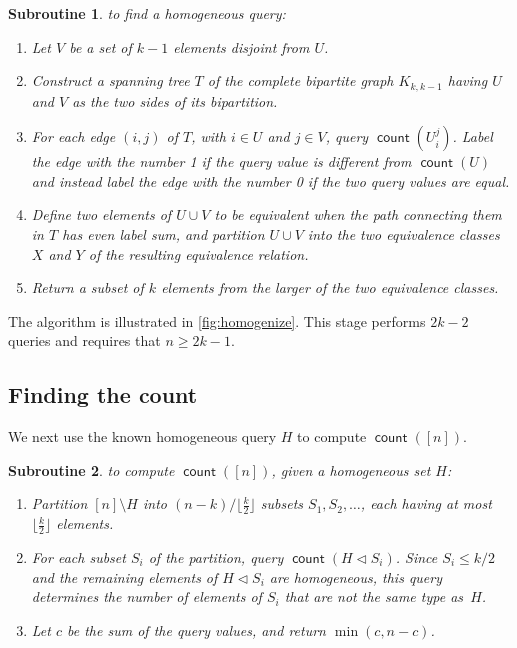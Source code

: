 \documentclass[11pt]{llncs}
\newcommand{\qcount}{\operatorname{\mathsf{count}}}
\newcommand{\inject}{\triangleleft}
\newtheorem{subroutine}{Subroutine}
\begin{document}
\begin{subroutine} to find a homogeneous query:
\label{sbr:homogeneous}
\begin{enumerate}
\item Let $V$ be a set of $k-1$ elements disjoint from $U$.
\item Construct a spanning tree $T$ of the complete bipartite graph $K_{k,k-1}$ having $U$ and $V$ as the two sides of its bipartition.
\item For each edge $(i,j)$ of $T$, with $i\in U$ and $j\in V$, query $\qcount(U_i^j)$. Label the edge with the number 1 if the query value is different from $\qcount(U)$ and instead label the edge with the number 0 if the two query values are equal.
\item Define two elements of $U\cup V$ to be equivalent when the path connecting them in $T$ has even label sum, and partition $U\cup V$ into the two equivalence classes $X$ and $Y$ of the resulting equivalence relation.
\item Return a subset of $k$ elements from the larger of the two equivalence classes.\end{enumerate}
\end{subroutine}

The algorithm is illustrated in \autoref{fig:homogenize}.
This stage performs $2k-2$ queries and requires that $n\ge 2k-1$.

\subsection{Finding the count}

We next use the known homogeneous query $H$ to compute $\qcount([n])$.

\begin{subroutine} to compute $\qcount([n])$, given a homogeneous set $H$:
\begin{enumerate}
\item Partition $[n]\setminus H$ into $(n-k)/\lfloor \tfrac{k}{2}\rfloor$ subsets $S_1,S_2,\dots$, each having at most $\lfloor \tfrac{k}{2}\rfloor$ elements.
\item For each subset $S_i$ of the partition, query $\qcount(H\inject S_i)$. Since $S_i\le k/2$ and the remaining elements of $H\inject S_i$ are homogeneous, this query determines the number of elements of $S_i$ that are not the same type as~$H$.
\item Let $c$ be the sum of the query values, and return $\min(c,n-c)$.
\end{enumerate}
\end{subroutine}
\end{document}
